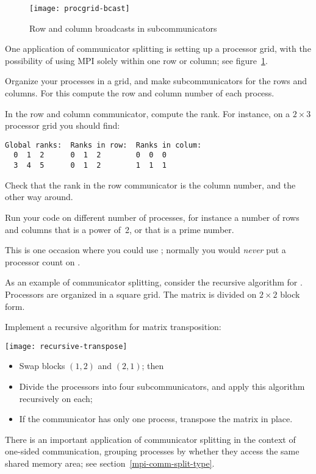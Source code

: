 \begin{figure}[ht]
  \texttt{[image: procgrid-bcast]}
  \caption{Row and column broadcasts in subcommunicators}
  \label{fig:procgrid-bcast}
\end{figure}

One application of communicator splitting is setting up a processor
grid, with the possibility of using MPI solely within one row or
column; see figure~\ref{fig:procgrid-bcast}.

\begin{exercise}
  \label{ex:rowcolcomm}
  Organize your processes in a grid, and make subcommunicators for
  the rows and columns. For this compute the row and column number of
  each process.

  In the row and column communicator, compute the rank. For instance,
  on a $2\times3$ processor grid you should find:
\begin{verbatim}
Global ranks:  Ranks in row:  Ranks in colum:
  0  1  2      0  1  2        0  0  0
  3  4  5      0  1  2        1  1  1
\end{verbatim}

  Check that the rank in the row communicator is the column number,
  and the other way around.

  Run your code on different number of processes, for instance a
  number of rows and columns that is a power of~2, or that is a prime number.
\begin{tacc}
    This is one occasion where you could use ;
    normally you would \emph{never} put a processor count on .
\end{tacc}
\end{exercise}

As an example of communicator splitting, consider the recursive
algorithm for .
Processors are organized in a square grid. The matrix is divided
on $2\times 2$ block form.

\begin{exercise}
  \label{ex:recursivetranspose}
  Implement a recursive algorithm for matrix transposition:
  
  \texttt{[image: recursive-transpose]}

  \begin{itemize}
  \item Swap blocks $(1,2)$ and $(2,1)$; then
  \item Divide the processors into four subcommunicators, and
    apply this algorithm recursively on each;
  \item If the communicator has only one process, transpose the matrix in place.
  \end{itemize}
\end{exercise}

There is an important application of communicator splitting in the
context of one-sided communication, grouping processes by whether they
access the same shared memory area; see section~\ref{mpi-comm-split-type}.

